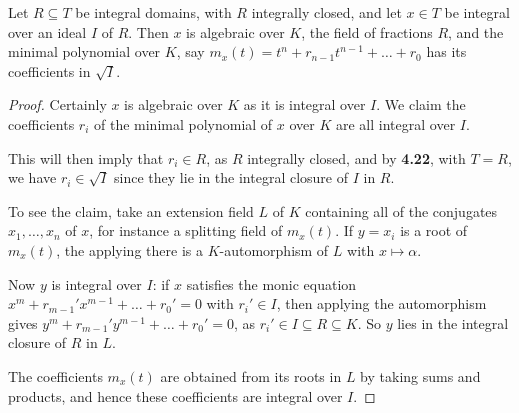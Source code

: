 \documentclass[10pt,a4paper]{article}
\begin{document}
\begin{lemma}
  Let $R \subseteq T$ be integral domains, with $R$ integrally closed, and let $x \in T$ be integral over an ideal $I$ of $R$. Then $x$ is algebraic over $K$, the field of fractions $R$, and the minimal polynomial over $K$, say $m_x(t) = t^n + r_{n-1}t^{n-1} + \ldots+ r_0$ has its coefficients in $\sqrt{I}$.
\end{lemma}
\begin{proof}
  Certainly $x$ is algebraic over $K$ as it is integral over $I$. We claim the coefficients $r_i$ of the minimal polynomial of $x$ over $K$ are all integral over $I$.

  This will then imply that $r_i \in R$, as $R$ integrally closed, and by \textbf{4.22}, with $T=R$, we have $r_i \in \sqrt{I}$ since they lie in the integral closure of $I$ in $R$.

  To see the claim, take an extension field $L$ of $K$ containing all of the conjugates $x_1, \ldots, x_n$ of $x$, for instance a splitting field of $m_x(t)$. If $y = x_i$ is a root of $m_x(t)$, the applying there is a $K$-automorphism of $L$ with $x \mapsto \alpha$.

  Now $y$ is integral over $I$: if $x$ satisfies the monic equation $x^m + r_{m-1}'x^{m-1} + \ldots +r_0' = 0$ with $r_i' \in I$, then applying the automorphism gives $y^m + r_{m-1}'y^{m-1} + \ldots +r_0' = 0$, as $r_i'\in I \subseteq R \subseteq K$. So $y$ lies in the integral closure of $R$ in $L$.

  The coefficients $m_x(t)$ are obtained from its roots in $L$ by taking sums and products, and hence these coefficients are integral over $I$.
\end{proof}
\end{document}
